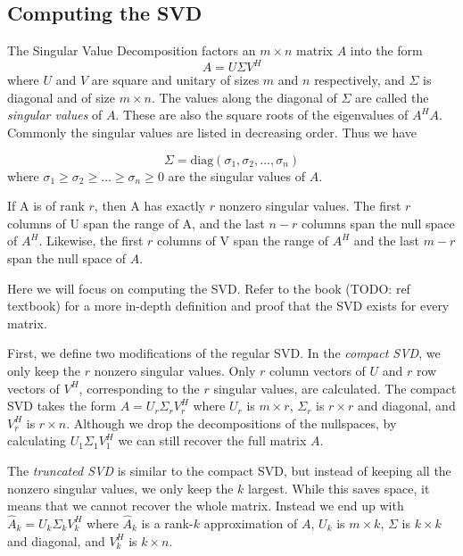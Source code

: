 \subsection*{Computing the SVD}


The Singular Value Decomposition factors an $m \times n$ matrix $A$ into the form
\begin{equation*}
A = U \Sigma V^H
\end{equation*}
where $U$ and $V$ are square and unitary of sizes $m$ and $n$ respectively, and $\Sigma$ is diagonal and of size $m \times n$.
The values along the diagonal of $\Sigma$ are called the \emph{singular values} of $A$. 
These are also the square roots of the eigenvalues of $A^HA$.
Commonly the singular values are listed in decreasing order. Thus we have

\begin{equation*}
\Sigma = \mbox{diag}(\sigma_1,\sigma_2,\ldots,\sigma_n)
\end{equation*}
where $\sigma_1 \geq \sigma_2 \geq \ldots \geq \sigma_n \geq 0$ are the singular values of $A$.

If A is of rank $r$, then A has exactly $r$ nonzero singular values.
The first $r$ columns of U span the range of A, and the last $n -r$ columns span the null space of $A^H$.
Likewise, the first $r$ columns of V span the range of $A^H$ and the last $m - r$ span the null space of $A$.

Here we will focus on computing the SVD. 
Refer to the book (TODO: ref textbook) for a more in-depth definition and proof that the SVD exists for every matrix.


First, we define two modifications of the regular SVD.
In the \emph{compact SVD}, we only keep the $r$ nonzero singular values.
Only $r$ column vectors of $U$ and $r$ row vectors of $V^H$, corresponding to the $r$ singular values, are calculated.
The compact SVD takes the form $A= U_r \Sigma_r V_r^H$ where $U_r$ is $m\times r$, $\Sigma_r$ is $r\times r$ and diagonal, and $V_r^H$ is $r\times n$.
Although we drop the decompositions of the nullspaces, by calculating $U_1 \Sigma_1 V_1^H$ we can still recover the full matrix $A$.

The \emph{truncated SVD} is similar to the compact SVD, but instead of keeping all the nonzero singular values, we only keep the $k$ largest.
While this saves space, it means that we cannot recover the whole matrix.
Instead we end up with $\widehat A_k = U_k\Sigma_k V_k^H$ where $\widehat A_k$ is a rank-$k$ approximation of $A$, $U_k$ is $m\times k$, $\Sigma$ is $k \times k$ and diagonal, and $V_k^H$ is $k \times n$.

